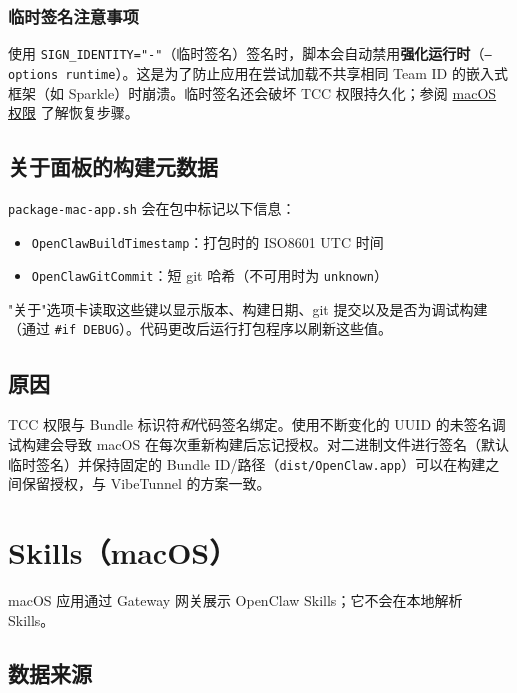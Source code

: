 \subsubsection{临时签名注意事项}


使用 \texttt{SIGN\_IDENTITY="-"}（临时签名）签名时，脚本会自动禁用\textbf{强化运行时}（\texttt{--options runtime}）。这是为了防止应用在尝试加载不共享相同 Team ID 的嵌入式框架（如 Sparkle）时崩溃。临时签名还会破坏 TCC 权限持久化；参阅 \href{/platforms/mac/permissions}{macOS 权限} 了解恢复步骤。

\subsection{关于面板的构建元数据}


\texttt{package-mac-app.sh} 会在包中标记以下信息：

\begin{itemize}
  \item \texttt{OpenClawBuildTimestamp}：打包时的 ISO8601 UTC 时间
  \item \texttt{OpenClawGitCommit}：短 git 哈希（不可用时为 \texttt{unknown}）
\end{itemize}


"关于"选项卡读取这些键以显示版本、构建日期、git 提交以及是否为调试构建（通过 \texttt{\#if DEBUG}）。代码更改后运行打包程序以刷新这些值。

\subsection{原因}


TCC 权限与 Bundle 标识符\textit{和}代码签名绑定。使用不断变化的 UUID 的未签名调试构建会导致 macOS 在每次重新构建后忘记授权。对二进制文件进行签名（默认临时签名）并保持固定的 Bundle ID/路径（\texttt{dist/OpenClaw.app}）可以在构建之间保留授权，与 VibeTunnel 的方案一致。


\clearpage

\section{Skills（macOS）}


macOS 应用通过 Gateway 网关展示 OpenClaw Skills；它不会在本地解析 Skills。

\subsection{数据来源}


